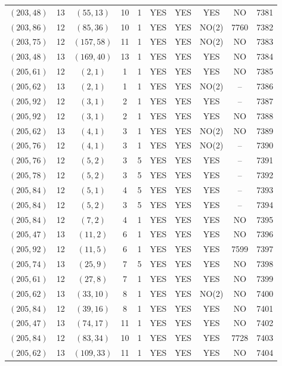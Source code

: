 \begin{longtable}{|c|c|c|c|c|c|c|c|c|c|}
$(203, 48)$ & 13 & $(55, 13)$ & 10 & 1 & YES & YES & YES & NO & 7381\\
$(203, 86)$ & 12 & $(85, 36)$ & 10 & 1 & YES & YES & NO(2) & 7760 & 7382\\
$(203, 75)$ & 12 & $(157, 58)$ & 11 & 1 & YES & YES & NO(2) & NO & 7383\\
$(203, 48)$ & 13 & $(169, 40)$ & 13 & 1 & YES & YES & YES & NO & 7384\\
$(205, 61)$ & 12 & $(2, 1)$ & 1 & 1 & YES & YES & YES & NO & 7385\\
$(205, 62)$ & 13 & $(2, 1)$ & 1 & 1 & YES & YES & NO(2) & -- & 7386\\
$(205, 92)$ & 12 & $(3, 1)$ & 2 & 1 & YES & YES & YES & -- & 7387\\
$(205, 92)$ & 12 & $(3, 1)$ & 2 & 1 & YES & YES & YES & NO & 7388\\
$(205, 62)$ & 13 & $(4, 1)$ & 3 & 1 & YES & YES & NO(2) & NO & 7389\\
$(205, 76)$ & 12 & $(4, 1)$ & 3 & 1 & YES & YES & NO(2) & -- & 7390\\
$(205, 76)$ & 12 & $(5, 2)$ & 3 & 5 & YES & YES & YES & -- & 7391\\
$(205, 78)$ & 12 & $(5, 2)$ & 3 & 5 & YES & YES & YES & -- & 7392\\
$(205, 84)$ & 12 & $(5, 1)$ & 4 & 5 & YES & YES & YES & -- & 7393\\
$(205, 84)$ & 12 & $(5, 2)$ & 3 & 5 & YES & YES & YES & -- & 7394\\
$(205, 84)$ & 12 & $(7, 2)$ & 4 & 1 & YES & YES & YES & NO & 7395\\
$(205, 47)$ & 13 & $(11, 2)$ & 6 & 1 & YES & YES & YES & NO & 7396\\
$(205, 92)$ & 12 & $(11, 5)$ & 6 & 1 & YES & YES & YES & 7599 & 7397\\
$(205, 74)$ & 13 & $(25, 9)$ & 7 & 5 & YES & YES & YES & NO & 7398\\
$(205, 61)$ & 12 & $(27, 8)$ & 7 & 1 & YES & YES & YES & NO & 7399\\
$(205, 62)$ & 13 & $(33, 10)$ & 8 & 1 & YES & YES & NO(2) & NO & 7400\\
$(205, 84)$ & 12 & $(39, 16)$ & 8 & 1 & YES & YES & YES & NO & 7401\\
$(205, 47)$ & 13 & $(74, 17)$ & 11 & 1 & YES & YES & YES & NO & 7402\\
$(205, 84)$ & 12 & $(83, 34)$ & 10 & 1 & YES & YES & YES & 7728 & 7403\\
$(205, 62)$ & 13 & $(109, 33)$ & 11 & 1 & YES & YES & YES & NO & 7404\\

\end{longtable}
